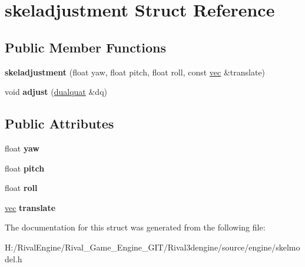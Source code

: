 \hypertarget{structskeladjustment}{}\section{skeladjustment Struct Reference}
\label{structskeladjustment}
\subsection*{Public Member Functions}
\begin{DoxyCompactItemize}
\item 
\mbox{\label{structskeladjustment_ad2e6fa1a31d45aa83d961565b954c8a9}} 
{\bfseries skeladjustment} (float yaw, float pitch, float roll, const \hyperlink{structvec}{vec} \&translate)
\item 
\mbox{\label{structskeladjustment_a5192ca6c0ca148f3aefcf1352cb1c6ac}} 
void {\bfseries adjust} (\hyperlink{structdualquat}{dualquat} \&dq)
\end{DoxyCompactItemize}
\subsection*{Public Attributes}
\begin{DoxyCompactItemize}
\item 
\mbox{\label{structskeladjustment_a0c3ca138eec2ed71a9542eac268d921e}} 
float {\bfseries yaw}
\item 
\mbox{\label{structskeladjustment_ab212977c3bd8cf6711f5eafc0f2bfb6c}} 
float {\bfseries pitch}
\item 
\mbox{\label{structskeladjustment_a170d16ce6a8b0ffb45cfc16d5c13817e}} 
float {\bfseries roll}
\item 
\mbox{\label{structskeladjustment_a0f72f8509554fdc67392ca4eae9b9ff9}} 
\hyperlink{structvec}{vec} {\bfseries translate}
\end{DoxyCompactItemize}


The documentation for this struct was generated from the following file\+:\begin{DoxyCompactItemize}
\item 
H\+:/\+Rival\+Engine/\+Rival\+\_\+\+Game\+\_\+\+Engine\+\_\+\+G\+I\+T/\+Rival3dengine/source/engine/skelmodel.\+h\end{DoxyCompactItemize}
